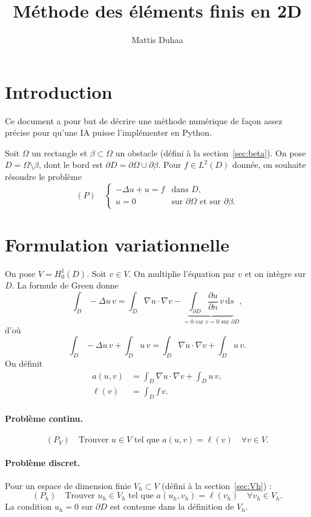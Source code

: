 \documentclass[11pt,a4paper]{article}
\title{Méthode des éléments finis en 2D}
\author{Mattis Duhaa}
\date{}
\begin{document}
\maketitle

\section{Introduction}

Ce document a pour but de décrire une méthode numérique de façon assez
précise pour qu'une IA puisse l'implémenter en Python.

Soit $\Omega$ un rectangle et $\beta \subset \Omega$ un obstacle (défini à la
section~\ref{sec:beta}). On pose $D = \Omega \setminus \beta$, dont le bord
est $\partial D = \partial\Omega \cup \partial\beta$. Pour $f \in L^2(D)$
donnée, on souhaite résoudre le problème
\[
(P)\quad
\begin{cases}
-\Delta u + u = f & \text{dans } D,\\[2pt]
u = 0 & \text{sur } \partial\Omega \text{ et sur } \partial\beta .
\end{cases}
\]

\section{Formulation variationnelle}

On pose $V = H^1_0(D)$. Soit $v \in V$. On multiplie l'équation par $v$ et
on intègre sur $D$. La formule de Green donne
\[
\int_D -\Delta u \, v
= \int_D \nabla u \cdot \nabla v
- \underbrace{\int_{\partial D} \frac{\partial u}{\partial n}\, v \,\mathrm{d}s}_{=0 \text{ car } v = 0 \text{ sur } \partial D} ,
\]
d'où
\[
\int_D -\Delta u \, v + \int_D u\, v
= \int_D \nabla u \cdot \nabla v + \int_D u\, v .
\]
On définit
\begin{align*}
a(u, v) &= \int_D \nabla u \cdot \nabla v + \int_D u\, v,\\
\ell(v) &= \int_D f\, v.
\end{align*}

\paragraph{Problème continu.}
\[
(P_V)\quad \text{Trouver } u \in V \text{ tel que } a(u, v) = \ell(v)
\quad \forall v \in V .
\]

\paragraph{Problème discret.} Pour un espace de dimension finie
$V_h \subset V$ (défini à la section~\ref{sec:Vh}) :
\[
(P_h)\quad \text{Trouver } u_h \in V_h \text{ tel que } a(u_h, v_h) = \ell(v_h)
\quad \forall v_h \in V_h .
\]
La condition $u_h = 0$ sur $\partial D$ est contenue dans la définition de
$V_h$.
\end{document}
